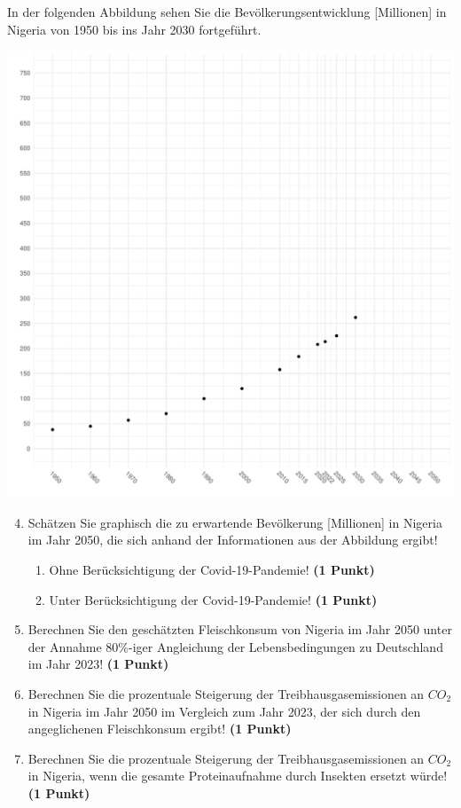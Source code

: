 \documentclass[a4paper, 9pt]{scrartcl}\usepackage[]{graphicx}\usepackage[]{xcolor}
\makeatletter
\def\maxwidth{ %
  \ifdim\Gin@nat@width>\linewidth
    \linewidth
  \else
    \Gin@nat@width
  \fi
}
\newenvironment{knitrout}{}{} %
\makeatother
\begin{document}
\newpage

In der folgenden Abbildung sehen Sie die Bevölkerungsentwicklung [Millionen] in Nigeria von 1950 bis ins Jahr 2030 fortgeführt.

\begin{knitrout}
\color{fgcolor}

{\centering \includegraphics[width=\maxwidth]{img/math-14-c-1} 

}


\end{knitrout}

\begin{enumerate}
  \setcounter{enumi}{3}  
\item Schätzen Sie graphisch die zu erwartende Bevölkerung [Millionen] in Nigeria im Jahr 2050, die sich anhand der Informationen aus der Abbildung ergibt!
\begin{enumerate}
\item Ohne Berücksichtigung der Covid-19-Pandemie! \textbf{(1 Punkt)}
\item Unter Berücksichtigung der Covid-19-Pandemie! \textbf{(1 Punkt)}
\end{enumerate}
\item Berechnen Sie den geschätzten Fleischkonsum von Nigeria im Jahr 2050 unter der Annahme 80\%-iger Angleichung der Lebensbedingungen zu Deutschland im Jahr 2023! \textbf{(1 Punkt)}
\item Berechnen Sie die prozentuale Steigerung der Treibhausgasemissionen an $CO_2$ in Nigeria im Jahr 2050 im Vergleich zum Jahr 2023, der sich durch den angeglichenen Fleischkonsum ergibt! \textbf{(1 Punkt)}
\item Berechnen Sie die prozentuale Steigerung der Treibhausgasemissionen an $CO_2$ in Nigeria, wenn die gesamte Proteinaufnahme durch Insekten ersetzt würde! \textbf{(1 Punkt)}
\end{enumerate}
\end{document}
